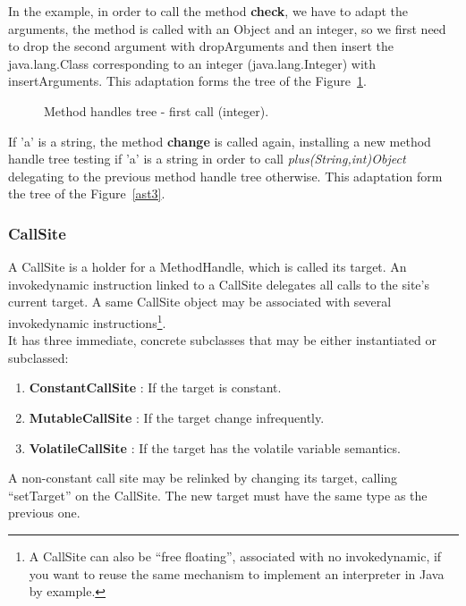 \documentclass{sig-alternate}
\begin{document}
      In the example, in order to call the method {\bf check}, we have to adapt the arguments,
      the method is called with an Object and an integer, so we first need to drop the second
      argument with dropArguments and then insert the java.lang.Class corresponding to an integer
      (java.lang.Integer) with insertArguments.
      This adaptation forms the tree of the Figure~\ref{ast2}.

      \begin{figure}[!ht]
        \hspace{-.6in} \resizebox{1.3\linewidth}{!}{}
        \caption{Method handles tree - first call (integer).}\vspace{-1em}
        \label{ast2}
      \end{figure}

      If 'a' is a string, the method {\bf change} is called again,
      installing a new method handle tree testing if 'a' is a string in order to call {\it plus(String,int)Object}
      delegating to the previous method handle tree otherwise.
      This adaptation form the tree of the Figure~\ref{ast3}.

      \begin{figure*}[!ht]
        \centering \resizebox{.8\linewidth}{!}{}
        \caption{Method handles tree - second call (string).}\vspace{-1em}
        \label{ast3}
      \end{figure*}

    \subsubsection{CallSite}

      A CallSite is a holder for a MethodHandle, which is called its target.
      An invokedynamic instruction linked to a CallSite delegates all calls to the site's current target.
      A same CallSite object may be associated with several invokedynamic
      instructions\footnote{A CallSite can also be ``free floating'', associated with no invokedynamic,
      if you want to reuse the same mechanism to implement an interpreter in Java by example.}.\\

      It has three immediate, concrete subclasses that may be either instantiated or subclassed:
      \begin{enumerate}
        \item \textbf{ConstantCallSite} : If the target is constant.
        \item \textbf{MutableCallSite}  : If the target change infrequently.
        \item \textbf{VolatileCallSite} : If the target has the volatile variable semantics.
      \end{enumerate}
      A non-constant call site may be relinked by changing its target, calling ``setTarget'' on the CallSite.
      The new target must have the same type as the previous one.
\end{document}
